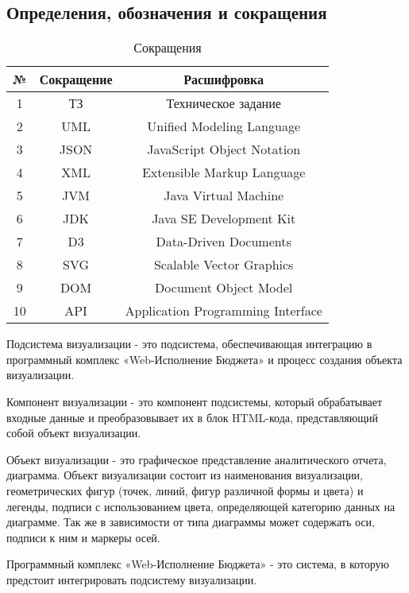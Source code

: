 \documentclass[a4paper]{extarticle}
\begin{document}
\subsection*{Определения, обозначения и сокращения}
\begin{table}[H]
\caption{Сокращения}
\centering
  \begin{tabular}{|c|c|c|}
  \hline
  №  & Сокращение & Расшифровка \\\hline
  1  & ТЗ   & Техническое задание \\\hline
  2  & UML  & Unified Modeling Language \\\hline
  3  & JSON & JavaScript Object Notation \\\hline
  4  & XML  & Extensible Markup Language \\\hline
  5  & JVM  & Java Virtual Machine \\\hline
  6  & JDK  & Java SE Development Kit \\\hline
  7  & D3   & Data-Driven Documents \\\hline
  8  & SVG  & Scalable Vector Graphics \\\hline
  9  & DOM  & Document Object Model \\\hline
  10 & API  & Application Programming Interface \\
  \hline
  \end{tabular}
\end{table}\par
Подсистема визуализации - это подсистема, обеспечивающая интеграцию в программный комплекс «Web-Исполнение Бюджета» и процесс создания объекта визуализации.\par
Компонент визуализации - это компонент подсистемы, который обрабатывает входные данные и преобразовывает их в блок HTML-кода, представляющий собой объект визуализации.\par
Объект визуализации - это графическое представление аналитического отчета, диаграмма. Объект визуализации состоит из наименования визуализации, геометрических фигур (точек, линий, фигур различной формы и цвета) и легенды, подписи с использованием цвета, определяющей категорию данных на диаграмме. Так же в зависимости от типа диаграммы может содержать оси, подписи к ним и маркеры осей.\par
Программный комплекс «Web-Исполнение Бюджета» - это система, в которую предстоит интегрировать подсистему визуализации.\par
\end{document}
